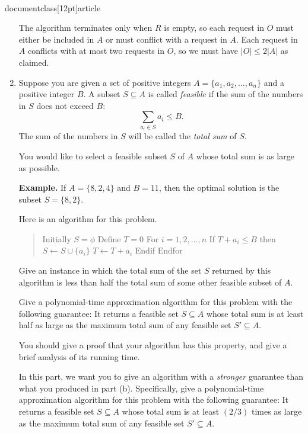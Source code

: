 \\documentclass[12pt]{article}
\begin{document}
\begin{enumerate}
{The algorithm terminates only when $R$ is empty, so each request
in $O$ must either be included in $A$ or must conflict with a request
in $A$. Each request in $A$ conflicts with at most two requests in $O$,
so we must have $|O| \le 2|A|$ as claimed.
}


\item 

Suppose you are given a set of positive integers
$A = \{a_1, a_2, \ldots, a_n\}$ and a positive integer $B$.
A subset $S \subseteq A$ is called {\em feasible}
if the sum of the numbers in $S$ does not exceed $B$:
$$\sum_{a_i \in S} a_i \leq B.$$
The sum of the numbers in $S$ will be called
the {\em total sum} of $S$.

You would like to select a feasible subset $S$ of $A$
whose total sum is as large as possible.

{\bf Example.}
If $A = \{8, 2, 4\}$ and $B = 11$, then the optimal
solution is the subset $S = \{8, 2\}$.

\medskip
{} 
Here is an algorithm for this problem.
\begin{quote}
\begin{code}
Initially $S = \phi$
Define $T = 0$
For $i = 1, 2, \ldots, n$
  If $T + a_i \leq B$ then
    $S \gets S \cup \{a_i\}$
    $T \gets T + a_i$
  Endif
Endfor
\end{code}
\end{quote}

Give an instance in which the total sum of the
set $S$ returned by this algorithm is less than
half the total sum of some other feasible subset of $A$.

Give a polynomial-time approximation algorithm for this problem with
the following guarantee:
It returns a feasible set $S \subseteq A$ whose total sum is
at least half as large as the maximum total sum of
any feasible set $S' \subseteq A$.

You should give a proof that your algorithm has this property,
and give a brief analysis of its running time.

In this part, we want you to give an
algorithm with a {\em stronger} guarantee than what
you produced in part (b).
Specifically, give a polynomial-time approximation algorithm
for this problem with the following guarantee:
It returns a feasible set $S \subseteq A$ whose total sum is
at least $(2/3)$ times as large as the maximum total sum of
any feasible set $S' \subseteq A$.


\end{enumerate}
\end{document}

